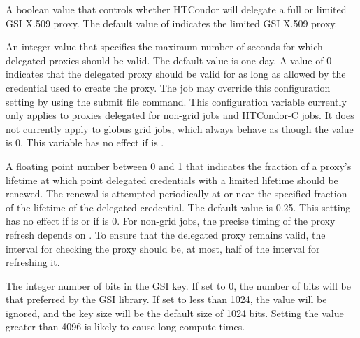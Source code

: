 \begin{description}
\label{param:DelegateFullJobGSICredentials} 
\item[\Macro{DELEGATE\_FULL\_JOB\_GSI\_CREDENTIALS}]
  A boolean value that controls whether HTCondor will delegate a full or limited
  GSI X.509 proxy.  
  The default value of  indicates the limited GSI X.509 proxy.

\label{param:DelegateJobGSICredentialsLifetime}
\item[\Macro{DELEGATE\_JOB\_GSI\_CREDENTIALS\_LIFETIME}]
  An integer value that specifies the maximum number of seconds for
  which delegated proxies should be valid.  
  The default value is one day.
  A value of 0 indicates that the delegated proxy should be valid for as
  long as allowed by the credential used to create the proxy.  
  The job may override this configuration setting by using the
   submit file
  command.  This configuration variable currently only applies to
  proxies delegated for non-grid jobs and HTCondor-C jobs.  It does not
  currently apply to globus grid jobs, which always behave as though
  the value is 0.
  This variable has no effect if 
  is .

\label{param:DelegateJobGSICredentialsRefresh}
\item[\Macro{DELEGATE\_JOB\_GSI\_CREDENTIALS\_REFRESH}]
  A floating point number between 0 and 1 that indicates the fraction of 
  a proxy's lifetime at which point delegated
  credentials with a limited lifetime should be renewed.  
  The renewal is attempted periodically at or near the specified fraction
  of the lifetime of the delegated credential.  
  The default value is 0.25.
  This setting has no effect if  is 
   or if
   is 0.  
  For non-grid jobs, the precise timing of the proxy refresh depends on
  .  
  To ensure that the delegated proxy remains valid, 
  the interval for checking the proxy should be,
  at most, half of the interval for refreshing it.

\label{param:GSIDelegationKeybits}
\item[\Macro{GSI\_DELEGATION\_KEYBITS}]
  The integer number of bits in the GSI key.
  If set to 0, the number of bits will be that preferred by the GSI library.
  If set to less than 1024, the value will be ignored, and the key size
  will be the default size of 1024 bits.
  Setting the value greater than 4096 is likely to cause long compute times.


\end{description}
